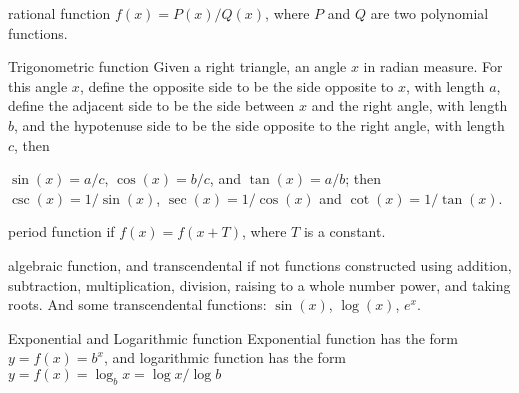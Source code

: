 \documentclass[Calculus 1 Recitation.tex]{subfiles}
\begin{document}
\begin{myleftlinebox}
	rational function
	\tcblower
	$f(x) = P(x)/Q(x)$, where $P$ and $Q$ are two polynomial functions.
\end{myleftlinebox}

\begin{myleftlinebox}
	Trigonometric function
	\tcblower
	Given a right triangle, an angle $x$ in radian measure. For this angle $x$, define the opposite side to be the side opposite to $x$, with length $a$, define the adjacent side to be the side between $x$ and the right angle, with length $b$, and the hypotenuse side to be the side opposite to the right angle, with length $c$, then
	
	$\sin(x) = a/c$, $\cos(x)=b/c$, and $\tan(x) = a/b$; then $\csc(x)=1/\sin(x)$, $\sec(x)=1/\cos(x)$ and $\cot(x)=1/	\tan(x)$.
	\begin{center}
		\usetikzlibrary{angles,quotes}
	\end{center}
	
	
\end{myleftlinebox}

\begin{myleftlinebox}
	period function
	\tcblower
	if $f(x)=f(x+T)$, where $T$ is a constant.
\end{myleftlinebox}

\begin{myleftlinebox}
	algebraic function, and transcendental if not
	\tcblower
	functions constructed using addition, subtraction, multiplication, division, raising to a whole number power, and taking roots. And some transcendental functions: $\sin(x)$, $\log(x)$, $e^x$.
\end{myleftlinebox}

\begin{myleftlinebox}
	Exponential and Logarithmic function
	\tcblower
	Exponential function has the form $y=f(x)=b^x$, and logarithmic function has the form $y=f(x)=\log_b x = \log x/\log b$
\end{myleftlinebox}
\end{document}
